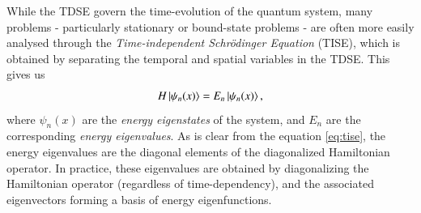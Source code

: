 \documentclass{subfiles}
\begin{document}
While the TDSE govern the time-evolution of the quantum system, many problems - particularly stationary or bound-state problems - are often more easily analysed through the \emph{Time-independent Schrödinger Equation} (TISE), which is obtained by separating the temporal and spatial variables in the TDSE. This gives us
\begin{equation}
    H\ket{\psi_n(x)} = E_n\ket{\psi_n(x)}\label{eq:tise},
\end{equation}
where $\psi_n(x)$ are the \emph{energy eigenstates} of the system, and $E_n$ are the corresponding \emph{energy eigenvalues}. As is clear from the equation \eqref{eq:tise}, the energy eigenvalues are the diagonal elements of the diagonalized Hamiltonian operator. In practice, these eigenvalues are obtained by diagonalizing the Hamiltonian operator (regardless of time-dependency), and the associated eigenvectors forming a basis of energy eigenfunctions. \\
\end{document}
